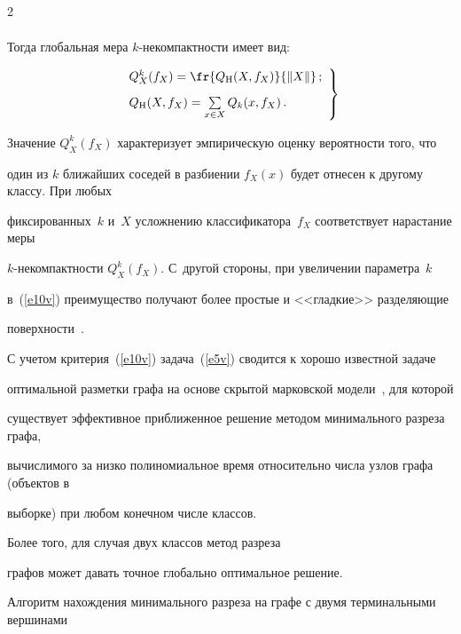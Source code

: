 \begin{multicols}{2}
\begin{align*}
\end{align*}

Тогда глобальная мера $k$-не\-ком\-пакт\-ности имеет вид:

\begin{equation}

\left.

\begin{array}{l}

Q^k_X(f_X)=\fr{Q_{\mathrm{H}}(X, f_X)}{\Vert X\Vert}\,;\\[9pt]

Q_{\mathrm{H}}(X, f_X)=\sum\limits_{x\in X} Q_k(x, f_X)\,.

\end{array}

\right\}

\label{e10v}

\end{equation}

Значение $Q^k_X(f_X)$ характеризует эмпирическую оценку вероятности того, что 

один из $k$ ближайших соседей в разбиении $f_X(x)$ будет отнесен к другому классу. При любых 

фиксированных~$k$ и~$X$ усложнению классификатора~$f_X$ соответствует нарастание меры 

$k$-не\-ком\-пакт\-ности $Q^k_X(f_X)$. С~другой стороны, при увеличении параметра~$k$ 

в~(\ref{e10v}) преимущество получают более простые и <<гладкие>> разделяющие 

поверхности~\cite{9v}.



С учетом критерия~(\ref{e10v}) задача~(\ref{e5v}) сводится к хорошо известной задаче 

оптимальной разметки графа на основе скрытой марковской модели~\cite{10v}, для которой 

существует эффективное приближенное решение методом минимального разреза графа, 

вычислимого за низко полиномиальное время относительно числа узлов графа (объектов в 

выборке) при любом конечном числе классов. 



Более того, для случая двух классов метод разреза 

графов может давать точное глобально оптимальное решение.



Алгоритм нахождения минимального разреза на графе с двумя терминальными вершинами 


\end{multicols}
